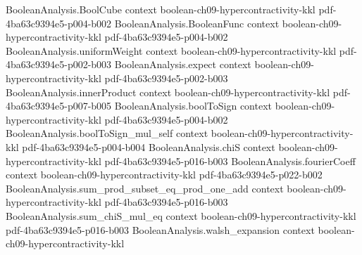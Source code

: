 \begin{lemma}
\leanok
{}
\label{BooleanAnalysis.Hypercontractivity.bonami_expect}
\proofstep
  {BooleanAnalysis.BoolCube}
  {context}
  {boolean-ch09-hypercontractivity-kkl}
  {pdf-4ba63c9394e5-p004-b002}
\proofstep
  {BooleanAnalysis.BooleanFunc}
  {context}
  {boolean-ch09-hypercontractivity-kkl}
  {pdf-4ba63c9394e5-p004-b002}
\proofstep
  {BooleanAnalysis.uniformWeight}
  {context}
  {boolean-ch09-hypercontractivity-kkl}
  {pdf-4ba63c9394e5-p002-b003}
\proofstep
  {BooleanAnalysis.expect}
  {context}
  {boolean-ch09-hypercontractivity-kkl}
  {pdf-4ba63c9394e5-p002-b003}
\proofstep
  {BooleanAnalysis.innerProduct}
  {context}
  {boolean-ch09-hypercontractivity-kkl}
  {pdf-4ba63c9394e5-p007-b005}
\proofstep
  {BooleanAnalysis.boolToSign}
  {context}
  {boolean-ch09-hypercontractivity-kkl}
  {pdf-4ba63c9394e5-p004-b002}
\proofstep
  {BooleanAnalysis.boolToSign_mul_self}
  {context}
  {boolean-ch09-hypercontractivity-kkl}
  {pdf-4ba63c9394e5-p004-b004}
\proofstep
  {BooleanAnalysis.chiS}
  {context}
  {boolean-ch09-hypercontractivity-kkl}
  {pdf-4ba63c9394e5-p016-b003}
\proofstep
  {BooleanAnalysis.fourierCoeff}
  {context}
  {boolean-ch09-hypercontractivity-kkl}
  {pdf-4ba63c9394e5-p022-b002}
\proofstep
  {BooleanAnalysis.sum_prod_subset_eq_prod_one_add}
  {context}
  {boolean-ch09-hypercontractivity-kkl}
  {pdf-4ba63c9394e5-p016-b003}
\proofstep
  {BooleanAnalysis.sum_chiS_mul_eq}
  {context}
  {boolean-ch09-hypercontractivity-kkl}
  {pdf-4ba63c9394e5-p016-b003}
\proofstep
  {BooleanAnalysis.walsh_expansion}
  {context}
  {boolean-ch09-hypercontractivity-kkl}

\end{lemma}

